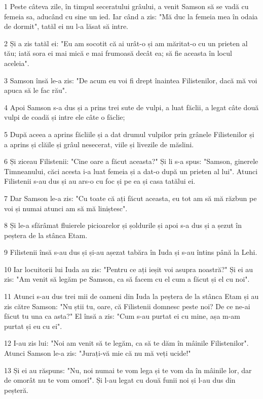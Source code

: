 \par 1 Peste câteva zile, în timpul seceratului grâului, a venit Samson să se vadă cu femeia sa, aducând cu sine un ied. Iar când a zis: "Mă duc la femeia mea în odaia de dormit", tatăl ei nu l-a lăsat să intre.
\par 2 Și a zis tatăl ei: "Eu am socotit că ai urât-o și am măritat-o cu un prieten al tău; iată sora ei mai mică e mai frumoasă decât ea; să fie aceasta în locul aceleia".
\par 3 Samson însă le-a zis: "De acum eu voi fi drept înaintea Filistenilor, dacă mă voi apuca să le fac rău".
\par 4 Apoi Samson s-a dus și a prins trei sute de vulpi, a luat făclii, a legat câte două vulpi de coadă și intre ele câte o făclie;
\par 5 După aceea a aprins făcliile și a dat drumul vulpilor prin grânele Filistenilor și a aprins și clăile și grâul nesecerat, viile și livezile de măslini.
\par 6 Și ziceau Filistenii: "Cine oare a făcut aceasta?" Și li s-a spus: "Samson, ginerele Timneanului, căci acesta i-a luat femeia și a dat-o după un prieten al lui". Atunci Filistenii s-au dus și au ars-o cu foc și pe ea și casa tatălui ei.
\par 7 Dar Samson le-a zis: "Cu toate că ați făcut aceasta, eu tot am să mă răzbun pe voi și numai atunci am să mă liniștesc".
\par 8 Și le-a sfărâmat fluierele picioarelor și șoldurile și apoi s-a dus și a șezut în peștera de la stânca Etam.
\par 9 Filistenii însă s-au dus și și-au așezat tabăra în Iuda și s-au întins până la Lehi.
\par 10 Iar locuitorii lui Iuda au zis: "Pentru ce ați ieșit voi asupra noastră?" Și ei au zis: "Am venit să legăm pe Samson, ca să facem cu el cum a făcut și el cu noi".
\par 11 Atunci s-au dus trei mii de oameni din Iuda la peștera de la stânca Etam și au zis către Samson: "Nu știi tu, oare, că Filistenii domnesc peste noi? De ce ne-ai făcut tu una ca asta?" El însă a zis: "Cum s-au purtat ei cu mine, așa m-am purtat și eu cu ei".
\par 12 I-au zis lui: "Noi am venit să te legăm, ca să te dăm în mâinile Filistenilor". Atunci Samson le-a zis: "Jurați-vă mie că nu mă veți ucide!"
\par 13 Și ei au răspuns: "Nu, noi numai te vom lega și te vom da în mâinile lor, dar de omorât nu te vom omorî". Și l-au legat cu două funii noi și l-au dus din peșteră.
